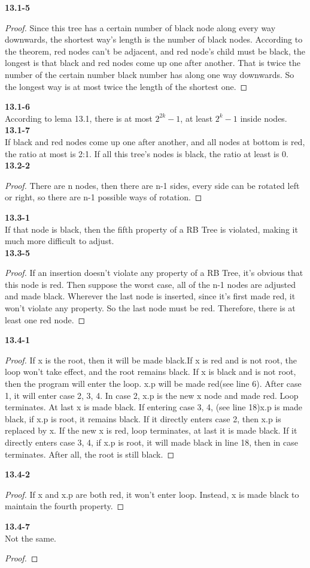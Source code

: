 \documentclass{article}
\begin{document}
\normalsize\textbf{13.1-5}
\begin{proof}
Since this tree has a certain number of black node along every way downwards, the shortest way's length is the number of black nodes. According to the theorem, red nodes can't be adjacent, and red node's child must be black, the longest is that black and red nodes come up one after another. That is twice the number of the certain number black number has along one way downwards. So the longest way is at most twice the length of the shortest one.
\end{proof}
\textbf{13.1-6}\\
According to lema 13.1, there is at most $2^{2k}-1$, at least $2^{k}-1$ inside nodes.\\
\textbf{13.1-7}\\
If black and red nodes come up one after another, and all nodes at bottom is red, the ratio at most is 2:1. If all this tree's nodes is black, the ratio at least is 0.\\
\textbf{13.2-2}
\begin{proof}
There are n nodes, then there are n-1 sides, every side can be rotated left or right, so there are n-1 possible ways of rotation.
\end{proof}
\textbf{13.3-1}\\
If that node is black, then the fifth property of a RB Tree is violated, making it much more difficult to adjust.\\
\textbf{13.3-5}
\begin{proof}
If an insertion doesn't violate any property of a RB Tree, it's obvious that this node is red. Then suppose the worst case, all of the n-1 nodes are adjusted and made black. Wherever the last node is inserted, since it's first made red, it won't violate any property. So the last node must be red. Therefore, there is at least one red node.
\end{proof}
\textbf{13.4-1}
\begin{proof}
If x is the root, then it will be made black.If x is red and is not root, the loop won't take effect, and the root remains black. If x is black and is not root, then the program will enter the loop. x.p will be made red(see line 6). After case 1, it will enter case 2, 3, 4. In case 2, x.p is the new x node and made red. Loop terminates. At last x is made black. If entering case 3, 4, (see line 18)x.p is made black, if x.p is root, it remains black. If it directly enters case 2, then x.p is replaced by x. If the new x is red, loop terminates, at last it is made black. If it directly enters case 3, 4, if x.p is root, it will made black in line 18, then in case terminates. After all, the root is still black.
\end{proof}
\textbf{13.4-2}
\begin{proof}
If x and x.p are both red, it won't enter loop. Instead, x is made black to maintain the fourth property.
\end{proof}
\textbf{13.4-7}\\
Not the same.
\begin{proof}
\end{proof}
\end{document}
